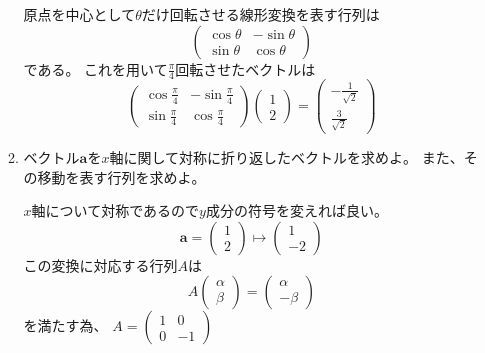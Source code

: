 \documentclass[10pt,b5paper]{ltjsarticle}
\begin{document}
\begin{enumerate}
\begin{enumerate}
             原点を中心として$\theta$だけ回転させる線形変換を表す行列は
             \begin{equation}
               \left(\begin{matrix}\cos\theta & -\sin\theta\\\sin\theta&\cos\theta\end{matrix}\right)
             \end{equation}
             である。
             これを用いて$\frac{\pi}{4}$回転させたベクトルは
             \begin{equation}
               \left(\begin{matrix}
                     \cos\frac{\pi}{4} & -\sin\frac{\pi}{4}\\
                     \sin\frac{\pi}{4} & \cos\frac{\pi}{4}
                     \end{matrix}\right)
               \left(\begin{matrix}1\\2\end{matrix}\right)
               =
                \left(\begin{matrix}-\frac{1}{\sqrt{2}}\\\frac{3}{\sqrt{2}}\end{matrix}\right)
             \end{equation}
       \item ベクトル$\bm{a}$を$x$軸に関して対称に折り返したベクトルを求めよ。
             また、その移動を表す行列を求めよ。

             $x$軸について対称であるので$y$成分の符号を変えれば良い。
             \begin{equation}
              \bm{a}=\left(\begin{matrix}1\\2\end{matrix}\right) \mapsto
              \left(\begin{matrix}1\\-2\end{matrix}\right)
             \end{equation}
             この変換に対応する行列$A$は
             \begin{equation}
              A\left(\begin{matrix}\alpha\\\beta\end{matrix}\right) =
              \left(\begin{matrix}\alpha\\-\beta\end{matrix}\right)
             \end{equation}
             を満たす為、
             $A=\left(\begin{matrix}1&0\\0&-1\end{matrix}\right)$


\end{enumerate}
\end{enumerate}
\end{document}
